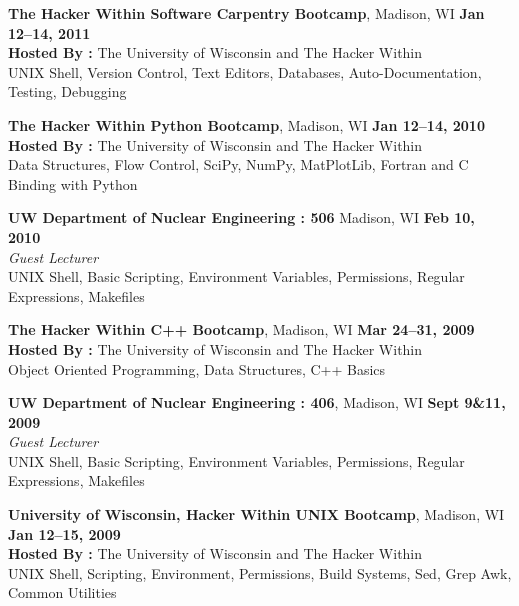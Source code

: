 \documentclass[margin,line]{resume}
\begin{document}
\begin{resume}
    \textbf{The Hacker Within Software Carpentry Bootcamp}, Madison, WI \hfill\textbf{Jan 12--14, 2011}\\
               \textbf{Hosted By : } The University of Wisconsin and The Hacker Within\\
               UNIX Shell, Version Control, Text Editors, Databases, Auto-Documentation, Testing, Debugging

    \textbf{The Hacker Within Python Bootcamp}, Madison, WI \hfill \textbf{Jan 12--14, 2010}\\
               \textbf{Hosted By : } The University of Wisconsin and The Hacker Within\\
               Data Structures, Flow Control, SciPy, NumPy, MatPlotLib, Fortran and C Binding with Python

    \textbf{UW Department of Nuclear Engineering : 506} Madison, WI \hfill \textbf{Feb 10, 2010}\\ 
               \textsl{Guest Lecturer}\\
               UNIX Shell, Basic Scripting, Environment Variables, Permissions, 
               Regular Expressions, Makefiles 

    \textbf{The Hacker Within C++ Bootcamp}, Madison, WI \hfill \textbf{Mar 24--31, 2009}\\
               \textbf{Hosted By : } The University of Wisconsin and The Hacker Within\\
               Object Oriented Programming, Data Structures, C++ Basics

    \textbf{UW Department of Nuclear Engineering : 406}, Madison, WI \hfill \textbf{Sept 9\&11, 2009}\\ 
               \textsl{Guest Lecturer}\\
               UNIX Shell, Basic Scripting, Environment Variables, Permissions, Regular Expressions, Makefiles 

    \textbf{University of Wisconsin, Hacker Within UNIX Bootcamp}, Madison, WI \hfill \textbf{Jan 12--15, 2009}\\
               \textbf{Hosted By : } The University of Wisconsin and The Hacker Within\\
               UNIX Shell, Scripting, Environment, Permissions, Build Systems, Sed, Grep Awk, Common Utilities
    \pagebreak

\end{resume}
\end{document}
